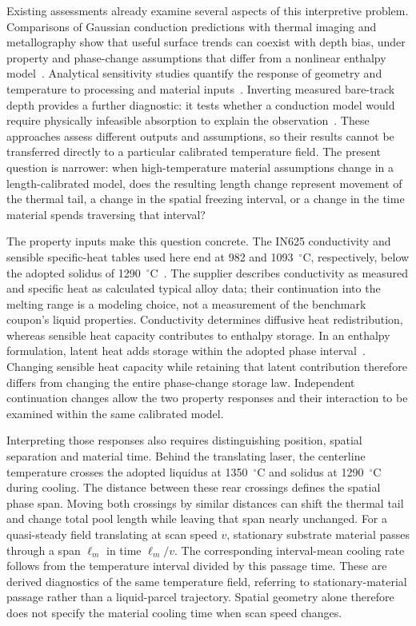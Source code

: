 Existing assessments already examine several aspects of this interpretive problem. Comparisons of Gaussian conduction predictions with thermal imaging and metallography show that useful surface trends can coexist with depth bias, under property and phase-change assumptions that differ from a nonlinear enthalpy model~\cite{soares2026}. Analytical sensitivity studies quantify the response of geometry and temperature to processing and material inputs~\cite{yang2024}. Inverting measured bare-track depth provides a further diagnostic: it tests whether a conduction model would require physically infeasible absorption to explain the observation~\cite{hong2026}. These approaches assess different outputs and assumptions, so their results cannot be transferred directly to a particular calibrated temperature field. The present question is narrower: when high-temperature material assumptions change in a length-calibrated model, does the resulting length change represent movement of the thermal tail, a change in the spatial freezing interval, or a change in the time material spends traversing that interval?

The property inputs make this question concrete. The IN625 conductivity and sensible specific-heat tables used here end at 982 and 1093~$^\circ$C, respectively, below the adopted solidus of 1290~$^\circ$C~\cite{specialmetals625}. The supplier describes conductivity as measured and specific heat as calculated typical alloy data; their continuation into the melting range is a modeling choice, not a measurement of the benchmark coupon's liquid properties. Conductivity determines diffusive heat redistribution, whereas sensible heat capacity contributes to enthalpy storage. In an enthalpy formulation, latent heat adds storage within the adopted phase interval~\cite{vanelsen2007}. Changing sensible heat capacity while retaining that latent contribution therefore differs from changing the entire phase-change storage law. Independent continuation changes allow the two property responses and their interaction to be examined within the same calibrated model.

Interpreting those responses also requires distinguishing position, spatial separation and material time. Behind the translating laser, the centerline temperature crosses the adopted liquidus at 1350~$^\circ$C and solidus at 1290~$^\circ$C during cooling. The distance between these rear crossings defines the spatial phase span. Moving both crossings by similar distances can shift the thermal tail and change total pool length while leaving that span nearly unchanged. For a quasi-steady field translating at scan speed $v$, stationary substrate material passes through a span $\ell_m$ in time $\ell_m/v$. The corresponding interval-mean cooling rate follows from the temperature interval divided by this passage time. These are derived diagnostics of the same temperature field, referring to stationary-material passage rather than a liquid-parcel trajectory. Spatial geometry alone therefore does not specify the material cooling time when scan speed changes.

